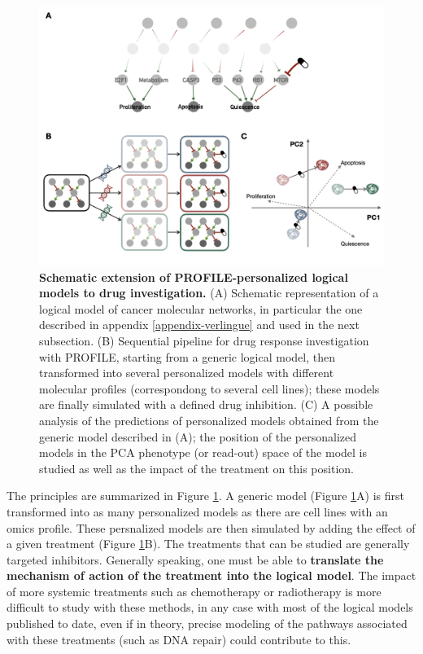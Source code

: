 \documentclass[a4paper,12pt,twoside,onecolumn,openright,final,oldfontcommands]{memoir}
\begin{document}
\begin{figure}

{\centering \includegraphics[width=0.9\linewidth]{fig/PROFILE-drug} 

}

\caption[Schematic extension of PROFILE-personalized logical models to drug investigation]{\textbf{Schematic extension of
PROFILE-personalized logical models to drug investigation.} (A)
Schematic representation of a logical model of cancer molecular
networks, in particular the one described in appendix
\ref{appendix-verlingue} and used in the next subsection. (B) Sequential
pipeline for drug response investigation with PROFILE, starting from a
generic logical model, then transformed into several personalized models
with different molecular profiles (correspondong to several cell lines);
these models are finally simulated with a defined drug inhibition. (C) A
possible analysis of the predictions of personalized models obtained
from the generic model described in (A); the position of the
personalized models in the PCA phenotype (or read-out) space of the
model is studied as well as the impact of the treatment on this
position.}\label{fig:PROFILE-drug}
\end{figure}
















The principles are summarized in Figure \ref{fig:PROFILE-drug}. A
generic model (Figure \ref{fig:PROFILE-drug}A) is first transformed into
as many personalized models as there are cell lines with an omics
profile. These persnalized models are then simulated by adding the
effect of a given treatment (Figure \ref{fig:PROFILE-drug}B). The
treatments that can be studied are generally targeted inhibitors.
Generally speaking, one must be able to \textbf{translate the mechanism
of action of the treatment into the logical model}. The impact of more
systemic treatments such as chemotherapy or radiotherapy is more
difficult to study with these methods, in any case with most of the
logical models published to date, even if in theory, precise modeling of
the pathways associated with these treatments (such as DNA repair) could
contribute to this.
\end{document}
